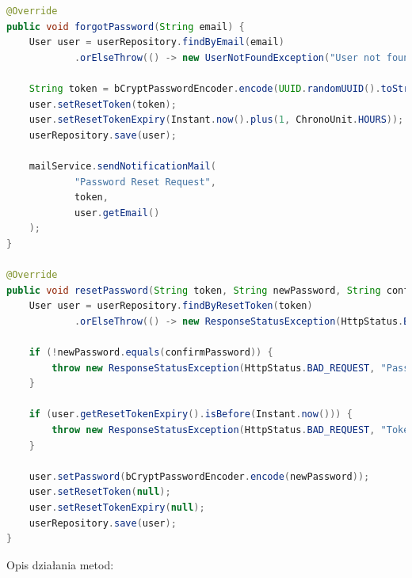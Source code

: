 \begin{lstlisting}[language=Java, caption=Metody resetowania hasła w klasie \texttt{AuthServiceImp}]
@Override
public void forgotPassword(String email) {
    User user = userRepository.findByEmail(email)
            .orElseThrow(() -> new UserNotFoundException("User not found"));

    String token = bCryptPasswordEncoder.encode(UUID.randomUUID().toString());
    user.setResetToken(token);
    user.setResetTokenExpiry(Instant.now().plus(1, ChronoUnit.HOURS));
    userRepository.save(user);

    mailService.sendNotificationMail(
            "Password Reset Request",
            token,
            user.getEmail()
    );
}

@Override
public void resetPassword(String token, String newPassword, String confirmPassword) {
    User user = userRepository.findByResetToken(token)
            .orElseThrow(() -> new ResponseStatusException(HttpStatus.BAD_REQUEST, "Invalid token"));

    if (!newPassword.equals(confirmPassword)) {
        throw new ResponseStatusException(HttpStatus.BAD_REQUEST, "Passwords do not match");
    }

    if (user.getResetTokenExpiry().isBefore(Instant.now())) {
        throw new ResponseStatusException(HttpStatus.BAD_REQUEST, "Token has expired");
    }

    user.setPassword(bCryptPasswordEncoder.encode(newPassword));
    user.setResetToken(null);
    user.setResetTokenExpiry(null);
    userRepository.save(user);
}
\end{lstlisting}

Opis działania metod:

